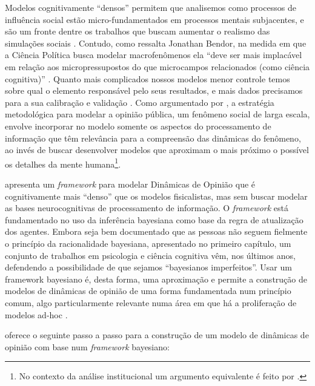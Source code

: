 Modelos cognitivamente ``densos'' permitem que analisemos como processos de
influência social estão micro-fundamentados em processos mentais subjacentes, e
são um fronte dentre os trabalhos que buscam aumentar o realismo das simulações
sociais \cite{jager2017,epstein2014agent_zero, conte2013minding}. Contudo, como
ressalta Jonathan Bendor, na medida em que a Ciência Política busca modelar
macrofenômenos ela ``deve ser mais implacável em relação aos micropressupostos
do que microcampos relacionados (como ciência cognitiva)''
\cite[p.45]{bendor2010bounded}. Quanto mais complicados nossos modelos menor
controle temos sobre qual o elemento responsável pelo seus resultados, e mais
dados precisamos para a sua calibração e validação \cite{de2005computational,
  bendor2010bounded}. Como argumentado por , a
estratégia metodológica para modelar a opinião pública, um fenômeno social de
larga escala, envolve incorporar no modelo somente os aspectos do processamento
de informação que têm relevância para a compreensão das dinâmicas do fenômeno,
ao invés de buscar desenvolver modelos que aproximam o mais próximo o possível
os detalhes da mente humana\footnote{No contexto da análise institucional um
  argumento equivalente é feito por .}.


 apresenta um \textit{framework} para modelar
Dinâmicas de Opinião que é cognitivamente mais
``denso'' que os modelos fisicalistas, mas sem buscar modelar as bases
neurocognitivas de processamento de informação. O \textit{framework} está
fundamentado no uso da inferência bayesiana como base da regra de atualização
dos agentes. Embora seja bem documentado que as pessoas não seguem fielmente o
princípio da racionalidade bayesiana, apresentado no primeiro capítulo, um
conjunto de trabalhos em psicologia e ciência cognitiva vêm, nos últimos anos,
defendendo a possibilidade de que sejamos ``bayesianos
imperfeitos''\cite{griffiths2006optimal,fujikawa2007perfect,baker2017rational,
  gintis2016individuality}. Usar um framework bayesiano é, desta forma, uma
aproximação e permite a construção de modelos de dinâmicas de opinião de uma
forma fundamentada num princípio comum, algo particularmente relevante numa área
em que há a proliferação de modelos ad-hoc \cite{flache2017,jager2017}.

  oferece o seguinte passo a passo
para a construção de um modelo de dinâmicas de opinião com base num
\textit{framework} bayesiano:

